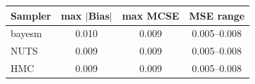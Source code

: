 \begin{tabular}{lccc}
\toprule
Sampler & max $|$Bias$|$ & max MCSE & MSE range \\
\midrule
bayesm & 0.010 & 0.009 & 0.005--0.008 \\
NUTS & 0.009 & 0.009 & 0.005--0.008 \\
HMC & 0.009 & 0.009 & 0.005--0.008 \\
\bottomrule
\end{tabular}

